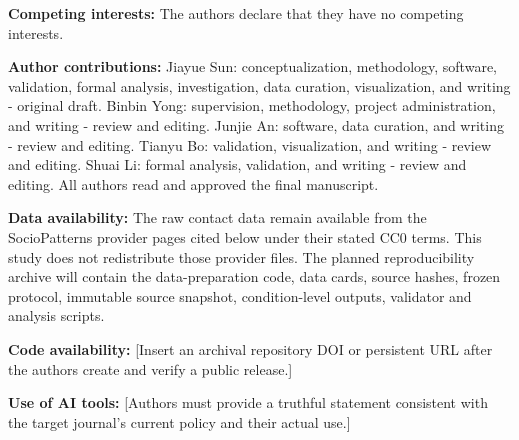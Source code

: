 \documentclass[smallextended]{svjour3}
\begin{document}
\textbf{Competing interests:} The authors declare that they have no competing interests.

\textbf{Author contributions:} Jiayue Sun: conceptualization, methodology, software, validation, formal analysis, investigation, data curation, visualization, and writing - original draft. Binbin Yong: supervision, methodology, project administration, and writing - review and editing. Junjie An: software, data curation, and writing - review and editing. Tianyu Bo: validation, visualization, and writing - review and editing. Shuai Li: formal analysis, validation, and writing - review and editing. All authors read and approved the final manuscript.

\textbf{Data availability:} The raw contact data remain available from the SocioPatterns provider pages cited below under their stated CC0 terms. This study does not redistribute those provider files. The planned reproducibility archive will contain the data-preparation code, data cards, source hashes, frozen protocol, immutable source snapshot, condition-level outputs, validator and analysis scripts.

\textbf{Code availability:} [Insert an archival repository DOI or persistent URL after the authors create and verify a public release.]

\textbf{Use of AI tools:} [Authors must provide a truthful statement consistent with the target journal's current policy and their actual use.]

\FloatBarrier
\end{document}
